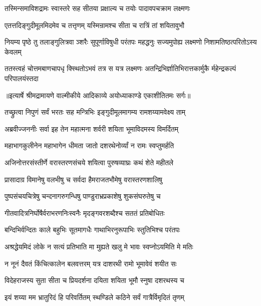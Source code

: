 \twolineshloka
{तस्मिन्समाविशद्रामः स्वास्तरे सह सीतया}
{प्रक्षाल्य च तयोः पादावपचक्राम लक्ष्मणः} %

\twolineshloka
{एतत्तदिङ्गुदीमूलमिदमेव च तत्तृणम्}
{यस्मिन्रामश्च सीता च रात्रिं तां शयितावुभौ} %

\fourlineindentedshloka
{नियम्य पृष्ठे तु तलाङ्गुलित्रवा}
{ञ्शरैः सुपूर्णाविषुधी परंतपः}
{महद्धनुः सज्यमुपोह्य लक्ष्मणो}
{ निशामतिष्ठत्परितोऽस्य केवलम्} %

\fourlineindentedshloka
{ततस्त्वहं चोत्तमबाणचापधृ}
{क्स्थितोऽभवं तत्र स यत्र लक्ष्मणः}
{अतन्द्रिभिर्ज्ञातिभिरात्तकार्मुकै}
{र्महेन्द्रकल्पं परिपालयंस्तदा} %


{॥इत्यार्षे श्रीमद्रामायणे वाल्मीकीये आदिकाव्ये अयोध्याकाण्डे एकाशीतितमः सर्गः॥}


\twolineshloka
{तच्छ्रुत्वा निपुणं सर्वं भरतः सह मन्त्रिभिः}
{इङ्गुदीमूलमागम्य रामशय्यामवेक्ष्य ताम्} %

\twolineshloka
{अब्रवीज्जननीः सर्वा इह तेन महात्मना}
{शर्वरी शयिता भूमाविदमस्य विमर्दितम्} %

\twolineshloka
{महाभागकुलीनेन महाभागेन धीमता}
{जातो दशरथेनोर्व्यां न रामः स्वप्तुमर्हति} %

\twolineshloka
{अजिनोत्तरसंस्तीर्णे वरास्तरणसंचये}
{शयित्वा पुरुषव्याघ्रः कथं शेते महीतले} %

\twolineshloka
{प्रासादाग्र विमानेषु वलभीषु च सर्वदा}
{हैमराजतभौमेषु वरास्तरणशालिषु} %

\twolineshloka
{पुष्पसंचयचित्रेषु चन्दनागरुगन्धिषु}
{पाण्डुराभ्रप्रकाशेषु शुकसंघरुतेषु च} %

\twolineshloka
{गीतवादित्रनिर्घोषैर्वराभरणनिःस्वनैः}
{मृदङ्गवरशब्दैश्च सततं प्रतिबोधितः} %

\twolineshloka
{बन्दिभिर्वन्दितः काले बहुभिः सूतमागधैः}
{गाथाभिरनुरूपाभिः स्तुतिभिश्च परंतपः} %

\twolineshloka
{अश्रद्धेयमिदं लोके न सत्यं प्रतिभाति मा}
{मुह्यते खलु मे भावः स्वप्नोऽयमिति मे मतिः} %

\twolineshloka
{न नूनं दैवतं किंचित्कालेन बलवत्तरम्}
{यत्र दाशरथी रामो भूमावेवं शयीत सः} %

\twolineshloka
{विदेहराजस्य सुता सीता च प्रियदर्शना}
{दयिता शयिता भूमौ स्नुषा दशरथस्य च} %

\twolineshloka
{इयं शय्या मम भ्रातुरिदं हि परिवर्तितम्}
{स्थण्डिले कठिने सर्वं गात्रैर्विमृदितं तृणम्} %

